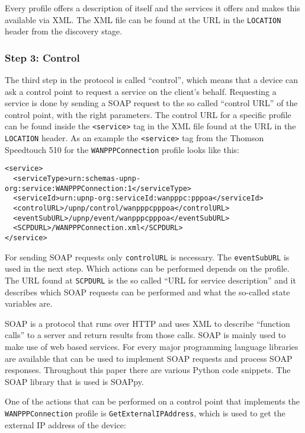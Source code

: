 \documentclass[10pt]{article}
\begin{document}
Every profile offers a description of itself and the services it offers
and makes this available via XML. The XML file can be found at the
URL in the \texttt{LOCATION} header from the discovery stage.

\subsubsection{Step 3: Control}

The third step in the protocol is called ``control'', which means that a
device can ask a control point to request a service on the client's behalf.
Requesting a service is done by sending a SOAP request to the so called
``control URL'' of the control point, with the right parameters. The control
URL for a specific profile can be found inside the \texttt{<service>} tag in
the XML file found at the URL in the \texttt{LOCATION} header. As an example
the \texttt{<service>} tag from the Thomson Speedtouch 510 for the
\texttt{WANPPPConnection} profile looks like this:

\begin{verbatim}
<service>
  <serviceType>urn:schemas-upnp-org:service:WANPPPConnection:1</serviceType>
  <serviceId>urn:upnp-org:serviceId:wanpppc:pppoa</serviceId>
  <controlURL>/upnp/control/wanpppcpppoa</controlURL>
  <eventSubURL>/upnp/event/wanpppcpppoa</eventSubURL>
  <SCPDURL>/WANPPPConnection.xml</SCPDURL>
</service>
\end{verbatim}

For sending SOAP requests only \texttt{controlURL} is necessary. The
\texttt{eventSubURL} is used in the next step. Which actions can be performed
depends on the profile. The URL found at \texttt{SCPDURL} is the so called
``URL for service description'' and it describes which SOAP requests can
be performed and what the so-called state variables are.

SOAP is a protocol that runs over HTTP and uses XML to describe ``function
calls'' to a server and return results from those calls. SOAP is mainly used to
make use of web based services. For every major programming language 
libraries are available that can be used to implement SOAP requests and process
SOAP responses. Throughout this paper there are various Python code snippets.
The SOAP library that is used is SOAPpy\cite{soappy}.

One of the actions that can be performed on a control point that implements
the \texttt{WANPPPConnection} profile is \texttt{GetExternalIPAddress}, which
is used to get the external IP address of the device:
\end{document}
